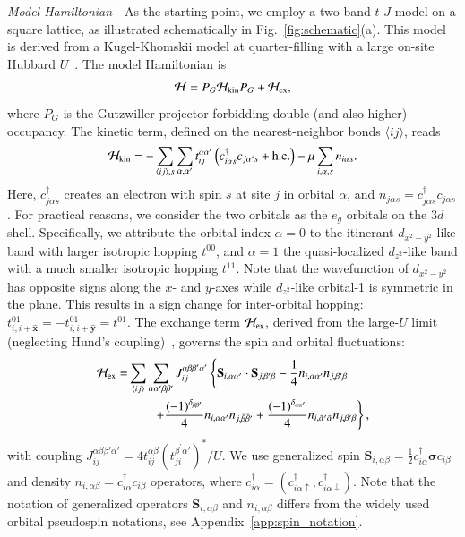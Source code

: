 \documentclass[reprint,superscriptaddress,amsmath,amssymb,aps,twocolumn]{revtex4-1}
\begin{document}
{\color{blue} \em  Model Hamiltonian}---As the starting point, we employ a two-band $t$-$J$ model on a square lattice, as illustrated schematically in Fig.~\ref{fig:schematic}(a). This model is derived from a Kugel-Khomskii model at quarter-filling with a large on-site Hubbard $U$~\cite{1973KK, 2025Zhange}. The model Hamiltonian is
\begin{equation}
\mathcal{H} = P_G\mathcal{H}_{\rm kin}P_G + \mathcal{H}_{\rm ex},    \label{eq:H_total}
\end{equation} 
where $P_G$ is the Gutzwiller projector forbidding double (and also higher) occupancy. The kinetic term, defined on the nearest-neighbor bonds $\langle ij \rangle$, reads 
\begin{equation}
\mathcal{H}_{\rm kin} = - \sum_{\langle ij\rangle,s} \sum_{\alpha,\alpha'} t_{ij}^{\alpha\alpha'} \left(c^\dagger_{i\alpha s} c_{j\alpha's} + \text{h.c.}\right) - \mu \sum_{i,\alpha,s} n_{i\alpha s}.
\label{eq:Hkn}
\end{equation}
Here, $c^\dagger_{j\alpha s}$ creates an electron with spin $s$ at site $j$ in orbital $\alpha$, and $n_{j\alpha s}=c^\dagger_{j\alpha s}c_{j\alpha s}$. For practical reasons, we consider the two orbitals as the $e_g$ orbitals on the $3d$ shell. Specifically, we attribute the orbital index $\alpha=0$ to the itinerant $d_{x^2-y^2}$-like band with larger isotropic hopping $t^{00}$, and $\alpha=1$ the quasi-localized $d_{z^2}$-like band with a much smaller isotropic hopping $t^{11}$. Note that the wavefunction of $d_{x^2-y^2}$ has opposite signs along the $x$- and $y$-axes while $d_{z^2}$-like orbital-1 is symmetric in the plane. This results in a sign change for inter-orbital hopping: $t_{i,i+\hat{\mathbf{x}}}^{01} =-t_{i,i+\hat{\mathbf{y}}}^{01}= t^{01}$. The exchange term $\mathcal{H}_{\rm ex}$, derived from the large-$U$ limit (neglecting Hund's coupling)~\cite{2025Zhange}, governs the spin and orbital fluctuations:
\begin{equation}
\begin{split}
\mathcal{H}_{\rm ex}=&\sum_{\langle ij\rangle}\sum_{\alpha\alpha^\prime\beta\beta^\prime} J^{\alpha\beta\beta'\alpha'}_{ij}\left\{
{\bf S}_{i,\alpha\alpha^\prime} \cdot {\bf S}_{j,\beta^\prime\beta} - \frac{1}{4}n_{i,\alpha\alpha^\prime} n_{j, \beta^\prime\beta}\right. \\ 
&\qquad\left. +\frac{\left(-1\right)^{\delta_{\beta\beta'}}}{4}  
n_{i,\alpha\alpha'}n_{j,\bar{\beta}\bar{\beta}'}+\frac{\left(-1\right)^{\delta_{\alpha\alpha'}}}{4}n_{i,\bar{\alpha}'\bar{\alpha}}n_{j,\beta'\beta}\right\},
\end{split}
\label{eq:Hex}
\end{equation}
with coupling $J^{\alpha\beta\beta'\alpha'}_{ij} = 4t_{ij}^{\alpha\beta}(t_{ji}^{\beta^\prime\alpha'})^*/U$. We use generalized spin $\mathbf{S}_{i,\alpha\beta} = \frac{1}{2} c_{i\alpha}^\dagger \bm{\sigma} c_{i\beta}$ and density $n_{i,\alpha\beta} = c_{i\alpha}^\dagger c_{i\beta}$ operators, where $c^\dagger_{i\alpha}=(c^\dagger_{i\alpha\uparrow}, c^\dagger_{i\alpha\downarrow})$. Note that the notation of generalized operators $\mathbf{S}_{i,\alpha\beta}$ and $n_{i,\alpha\beta}$ differs from the widely used orbital pseudospin notations, see Appendix~\ref{app:spin_notation}.
\end{document}
